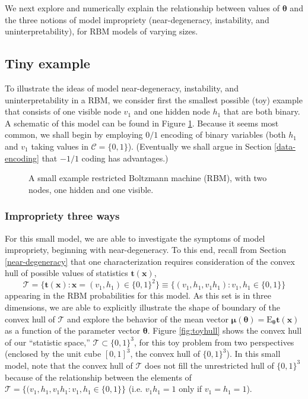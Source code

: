 \documentclass[]{article}
\theoremstyle{definition}
\begin{document}
We next explore and numerically explain the relationship between values
of \(\boldsymbol \theta\) and the three notions of model impropriety
(near-degeneracy, instability, and uninterpretability), for RBM models
of varying sizes.

\hypertarget{tiny-example}{%
\subsection{Tiny example}\label{tiny-example}}

To illustrate the ideas of model near-degeneracy, instability, and
uninterpretability in a RBM, we consider first the smallest possible
(toy) example that consists of one visible node \(v_1\) and one hidden
node \(h_1\) that are both binary. A schematic of this model can be
found in Figure \ref{fig:toymodel}. Because it seems most common, we
shall begin by employing \(0/1\) encoding of binary variables (both
\(h_1\) and \(v_1\) taking values in \(\mathcal{C} = \{0,1\}\)).
(Eventually we shall argue in Section \ref{data-encoding} that \(-1/1\)
coding has advantages.)
\begin{figure}[ht]
  \centering
  \resizebox{1cm}{!}{}
  \caption{A small example restricted Boltzmann machine (RBM), with two nodes, one hidden and one visible.}
  \label{fig:toymodel}
\end{figure}
\hypertarget{impropriety-three-ways}{%
\subsubsection{Impropriety three ways}\label{impropriety-three-ways}}

For this small model, we are able to investigate the symptoms of model
impropriety, beginning with near-degeneracy. To this end, recall from
Section \ref{near-degeneracy} that one characterization requires
consideration of the convex hull of possible values of statistics
\(\boldsymbol t(\boldsymbol x)\), \[
\mathcal{T} = \{\boldsymbol t(\boldsymbol x): \boldsymbol x = (v_1, h_1) \in \{0,1\}^2\} \equiv \{(v_1, h_1, v_1 h_1): v_1, h_1 \in \{0,1\}\}
\] appearing in the RBM probabilities for this model. As this set is in
three dimensions, we are able to explicitly illustrate the shape of
boundary of the convex hull of \(\mathcal{T}\) and explore the behavior
of the mean vector
\(\boldsymbol \mu(\boldsymbol \theta) = \text{E}_{\boldsymbol \theta} \boldsymbol t(\boldsymbol x)\)
as a function of the parameter vector \(\boldsymbol \theta\). Figure
\ref{fig:toyhull} shows the convex hull of our ``statistic space,''
\(\mathcal{T} \subset \{0,1\}^3\), for this toy problem from two
perspectives (enclosed by the unit cube \([0,1]^3\), the convex hull of
\(\{0,1\}^3\)). In this small model, note that the convex hull of
\(\mathcal{T}\) does not fill the unrestricted hull of \(\{0,1\}^3\)
because of the relationship between the elements of
\(\mathcal{T} = \{(v_1, h_1, v_1 h_1 : v_1, h_1 \in \{0, 1\} \}\) (i.e.
\(v_1 h_1 = 1\) only if \(v_1 = h_1 = 1\)).
\end{document}
